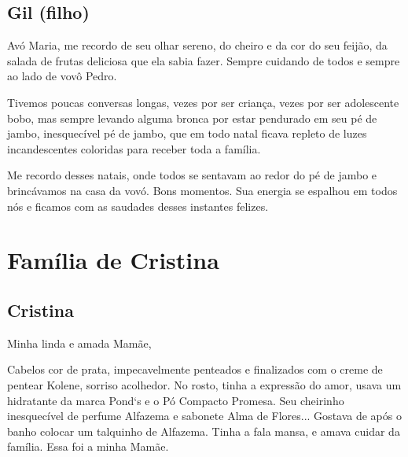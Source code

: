 \documentclass[
  brazil,
  a6paper,
  oneside,
  landscape,
  14pt]{scrbook}
\begin{document}
\hypertarget{gil-filho}{%
\section{Gil (filho)}\label{gil-filho}}

Avó Maria, me recordo de seu olhar sereno, do cheiro e da cor do seu
feijão, da salada de frutas deliciosa que ela sabia fazer. Sempre
cuidando de todos e sempre ao lado de vovô Pedro.

Tivemos poucas conversas longas, vezes por ser criança, vezes por ser
adolescente bobo, mas sempre levando alguma bronca por estar pendurado
em seu pé de jambo, inesquecível pé de jambo, que em todo natal ficava
repleto de luzes incandescentes coloridas para receber toda a família.

Me recordo desses natais, onde todos se sentavam ao redor do pé de jambo
e brincávamos na casa da vovó. Bons momentos. Sua energia se espalhou em
todos nós e ficamos com as saudades desses instantes felizes.

\hypertarget{famuxedlia-de-cristina}{%
\chapter{Família de Cristina}\label{famuxedlia-de-cristina}}

\hypertarget{cristina}{%
\section{Cristina}\label{cristina}}

Minha linda e amada Mamãe,

Cabelos cor de prata, impecavelmente penteados e finalizados com o creme
de pentear Kolene, sorriso acolhedor. No rosto, tinha a expressão do
amor, usava um hidratante da marca Pond`s e o Pó Compacto Promesa. Seu
cheirinho inesquecível de perfume Alfazema e sabonete Alma de Flores...
Gostava de após o banho colocar um talquinho de Alfazema. Tinha a fala
mansa, e amava cuidar da família. Essa foi a minha Mamãe.
\end{document}
